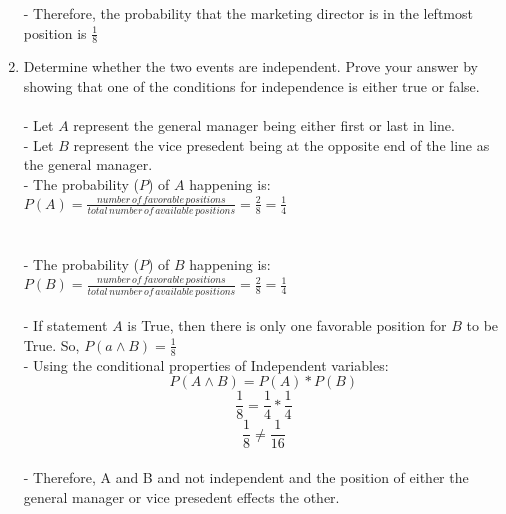 \documentclass{amsart}
\theoremstyle{definition}
\theoremstyle{Exercise}
\theoremstyle{remark}
\theoremstyle{rule}
\numberwithin{equation}{section}
\begin{document}
\begin{enumerate}[label=(\alph*)]
  - Therefore, the probability that the marketing director is in the leftmost position is $\frac{1}{8}$\\
  \item Determine whether the two events are independent. Prove your answer by showing that one of the conditions for independence is either true or false.
 \\\\
  - Let $A$ represent the general manager being either first or last in line.\\
  - Let $B$ represent the vice presedent being at the opposite end of the line as the general manager.\\
  - The probability ($P$) of $A$ happening is: $P(A) = \frac{number\, of\, favorable\, positions}{total\, number\, of\, available\, positions} = \frac{2}{8} = \frac{1}{4}$\\
  \\\\
  - The probability ($P$) of $B$ happening is: $P(B) = \frac{number\, of\, favorable\, positions}{total\, number\, of\, available\, positions} = \frac{2}{8} = \frac{1}{4}$
  \\\\
  - If statement $A$ is True, then there is only one favorable position for $B$ to be True. So, $P(a \land B) = \frac{1}{8}$\\
  - Using the conditional properties of Independent variables:\\
  $$P(A \land B) = P(A)*P(B)$$
  $$\frac{1}{8} = \frac{1}{4} * \frac{1}{4}$$
  $$\frac{1}{8} \neq \frac{1}{16}$$\\
  - Therefore, A and B and not independent and the position of either the general manager or vice presedent effects the other.\\
\\\\
\end{enumerate}
\end{document}
